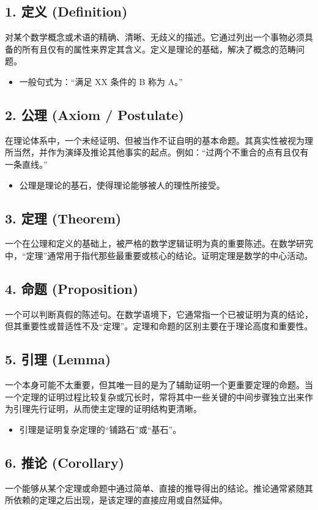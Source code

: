 \subsection*{1. 定义 (Definition)}
对某个数学概念或术语的精确、清晰、无歧义的描述。它通过列出一个事物必须具备的所有且仅有的属性来界定其含义。定义是理论的基础，解决了概念的范畴问题。
\begin{itemize}
    \item 一般句式为：“满足 XX 条件的 B 称为 A。”
\end{itemize}

\subsection*{2. 公理 (Axiom / Postulate)}
在理论体系中，一个未经证明、但被当作不证自明的基本命题。其真实性被视为理所当然，并作为演绎及推论其他事实的起点。例如：“过两个不重合的点有且仅有一条直线。”
\begin{itemize}
    \item 公理是理论的基石，使得理论能够被人的理性所接受。
\end{itemize}

\subsection*{3. 定理 (Theorem)}
一个在公理和定义的基础上，被严格的数学逻辑证明为真的重要陈述。在数学研究中，“定理”通常用于指代那些最重要或核心的结论。证明定理是数学的中心活动。

\subsection*{4. 命题 (Proposition)}
一个可以判断真假的陈述句。在数学语境下，它通常指一个已被证明为真的结论，但其重要性或普适性不及“定理”。定理和命题的区别主要在于理论高度和重要性。

\subsection*{5. 引理 (Lemma)}
一个本身可能不太重要，但其唯一目的是为了辅助证明一个更重要定理的命题。当一个定理的证明过程比较复杂或冗长时，常将其中一些关键的中间步骤独立出来作为引理先行证明，从而使主定理的证明结构更清晰。
\begin{itemize}
    \item 引理是证明复杂定理的“铺路石”或“基石”。
\end{itemize}

\subsection*{6. 推论 (Corollary)}
一个能够从某个定理或命题中通过简单、直接的推导得出的结论。推论通常紧随其所依赖的定理之后出现，是该定理的直接应用或自然延伸。

